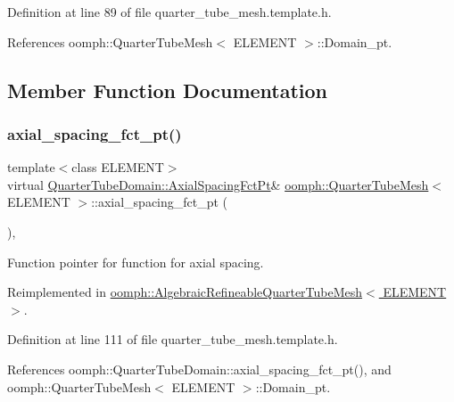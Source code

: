 Definition at line 89 of file quarter\+\_\+tube\+\_\+mesh.\+template.\+h.



References oomph\+::\+Quarter\+Tube\+Mesh$<$ E\+L\+E\+M\+E\+N\+T $>$\+::\+Domain\+\_\+pt.



\subsection{Member Function Documentation}
\mbox{\label{classoomph_1_1QuarterTubeMesh_a5c880d6214a07676a533227f813634d8}} 
\subsubsection{\texorpdfstring{axial\+\_\+spacing\+\_\+fct\+\_\+pt()}{axial\_spacing\_fct\_pt()}}
{\footnotesize\ttfamily template$<$class E\+L\+E\+M\+E\+NT$>$ \\
virtual \hyperlink{classoomph_1_1QuarterTubeDomain_ae347af42a5dcb9b3b82c2247975b01db}{Quarter\+Tube\+Domain\+::\+Axial\+Spacing\+Fct\+Pt}\& \hyperlink{classoomph_1_1QuarterTubeMesh}{oomph\+::\+Quarter\+Tube\+Mesh}$<$ E\+L\+E\+M\+E\+NT $>$\+::axial\+\_\+spacing\+\_\+fct\+\_\+pt (\begin{DoxyParamCaption}{ }\end{DoxyParamCaption})\hspace{0.3cm}{\ttfamily [inline]}, {\ttfamily [virtual]}}



Function pointer for function for axial spacing. 



Reimplemented in \hyperlink{classoomph_1_1AlgebraicRefineableQuarterTubeMesh_ac6518f83dd81c5ef1a8d908be8c9f473}{oomph\+::\+Algebraic\+Refineable\+Quarter\+Tube\+Mesh$<$ E\+L\+E\+M\+E\+N\+T $>$}.



Definition at line 111 of file quarter\+\_\+tube\+\_\+mesh.\+template.\+h.



References oomph\+::\+Quarter\+Tube\+Domain\+::axial\+\_\+spacing\+\_\+fct\+\_\+pt(), and oomph\+::\+Quarter\+Tube\+Mesh$<$ E\+L\+E\+M\+E\+N\+T $>$\+::\+Domain\+\_\+pt.

